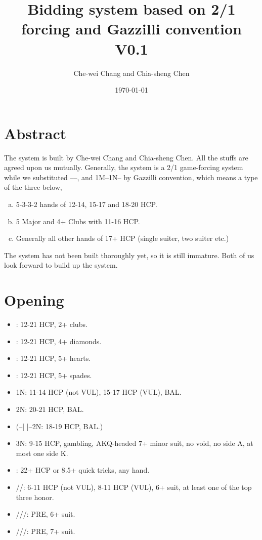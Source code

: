 \documentclass[12pt,twoside,a5paper]{report}%
\begin{document}
\title{Bidding system based on 2/1 forcing and Gazzilli convention V0.1}
\author{Che-wei Chang and Chia-sheng Chen}
\date{\today}
\maketitle
\tableofcontents


\chapter*{Abstract}
	The system is built by Che-wei Chang and Chia-sheng Chen. All the stuffs are agreed upon us mutually. Generally, the system is a 2/1 game-forcing system while we substituted ----, and 1M--1N-- by Gazzilli convention, which means a type of the three below,
	\begin{enumerate}[(a)]
		\item 5-3-3-2 hands of 12-14, 15-17 and 18-20 HCP.
		\item 5 Major and 4+ Clubs with 11-16 HCP.
		\item Generally all other hands of 17+ HCP (single suiter, two suiter etc.)  
	\end{enumerate}
	The system has not been built thoroughly yet, so it is still immature. Both of us look forward to build up the system.
\chapter*{Opening}
	\begin{itemize}
	\renewcommand{\labelitemi}{}
		\item {}: 12-21 HCP, 2+ clubs.
		\item {}: 12-21 HCP, 4+ diamonds.
		\item {}: 12-21 HCP, 5+ hearts.
		\item {}: 12-21 HCP, 5+ spades.
		\item 1N: 11-14 HCP (not VUL), 15-17 HCP (VUL), BAL.
		\item 2N: 20-21 HCP, BAL.
		\item (--[ ]--2N: 18-19 HCP, BAL.)
		\item 3N: 9-15 HCP, gambling, AKQ-headed 7+ minor suit, no void, no side A, at most one side K.
		\item {}: 22+ HCP or 8.5+ quick tricks, any hand.
		\item {}/\he{}/\sp{}: 6-11 HCP (not VUL), 8-11 HCP (VUL), 6+ suit, at least one of the top three honor.
		\item {}/\di{}/\he{}/\sp{}: PRE, 6+ suit.
		\item {}/\di{}/\he{}/\sp{}: PRE, 7+ suit.
	\end{itemize}
\end{document}
